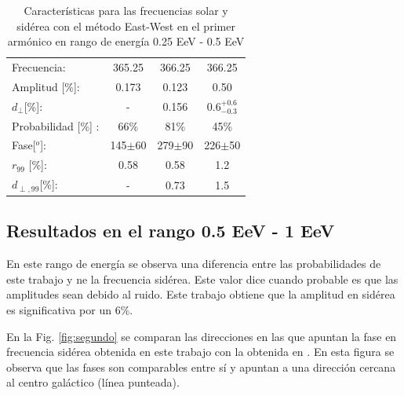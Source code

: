 \begin{table}[H]
    \begin{small}
        \begin{center}
            \begin{tabular}[c]{l|c||c|c}
                Frecuencia:         & 365.25	  & 366.25	   & 366.25 \cite{Aab_2020}   \\
                Amplitud [\%]:      & 0.173	      & 0.123	   & 0.50      \\
                $d_\perp$[\%]:      & -	          & 0.156	   & $0.6^{+0.6}_{-0.3}$       \\
                Probabilidad [\%] : & 66\%        & 81\%	   & 45\%       \\
                Fase[$^o$]:               & 145$\pm$60         & 279$\pm$90 & 226$\pm$50   	\\
                $r_{99}$ [\%]:      & 0.58	      & 0.58       & 1.2       \\
                $d_{\perp,99}$[\%]: & -           & 0.73       & 1.5      \\
            \end{tabular}
        \end{center}
    \end{small}
    \caption{Características para las frecuencias solar y sidérea con el método East-West en el primer armónico en rango de energía 0.25 EeV - 0.5 EeV}
    \label{tab:solar}
\end{table}


\subsection*{Resultados en el rango 0.5 EeV - 1 EeV}
En este rango de energía se observa una diferencia entre las probabilidades de este trabajo y \cite{Aab_2020}  ne la frecuencia sidérea. Este valor dice cuando probable es que las amplitudes sean debido al ruido. Este trabajo obtiene que la amplitud en sidérea es significativa por un  $6\%$.  

En la Fig. \ref{fig:segundo} se comparan las direcciones en las que apuntan la fase en frecuencia sidérea obtenida en este trabajo con la obtenida en \cite{Aab_2020}. En esta figura se observa que las fases son comparables entre sí y apuntan a una dirección cercana al centro galáctico (línea punteada).


